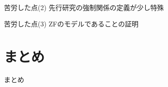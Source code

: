 \documentclass[17pt,aspectratio=169]{beamer}
\begin{document}
\begin{frame}{苦労した点(2)}
    先行研究の強制関係の定義が少し特殊
\end{frame}

\begin{frame}{苦労した点(3)}
    ZFのモデルであることの証明
\end{frame}

\section {まとめ}

\begin{frame}{まとめ}
\end{frame}
\end{document}
